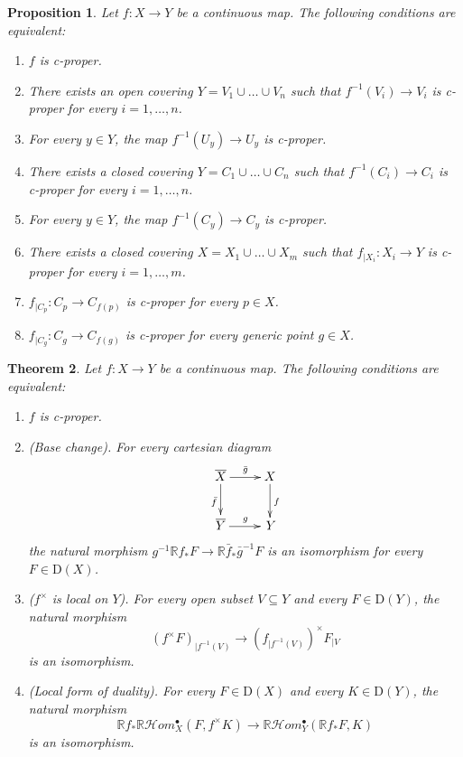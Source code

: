 \documentclass[amssymb,amscd,11pt,20pt]{amsart}
\newcommand{\RR}{\mathbb R}
\newcommand{\0}{\mathbf 0}
\newcommand{\pun}{{\scriptscriptstyle \bullet}}
\newcommand{\HHom}{\mathcal{H}om}
\theoremstyle{plain}
\newtheorem{thm}{Theorem}[section]
\newtheorem{prop}[thm]{Proposition}
\numberwithin{equation}{thm}
\begin{document}
\begin{prop}\label{cohprop-prop} Let $f\colon X\to Y$ be a continuous map. The following conditions are equivalent:
\begin{enumerate} \item $f$ is c-proper.
\item There exists an open covering $Y=V_1\cup\dots\cup V_n$ such that $  f^{-1}(V_i)\to V_i$ is c-proper for every $i=1,\dots,n$.
\item For every $y\in Y$, the map $  f^{-1}(U_y)\to U_y$ is c-proper.
\item There exists a closed covering $Y=C_1\cup\dots\cup C_n$ such that $  f^{-1}(C_i)\to C_i$ is c-proper for every $i=1,\dots,n$.
\item For every $y\in Y$, the map $  f^{-1}(C_y)\to C_y$ is c-proper.
\item There exists a closed covering $X=X_1\cup\dots \cup X_m$ such that $f_{\vert X_i}\colon X_i\to Y$ is c-proper for every $i=1,\dots ,m$.
\item $f_{\vert C_p}\colon C_p\to C_{f(p)}$ is c-proper for every $p\in X$.
\item $f_{\vert C_g}\colon C_g\to C_{f(g)}$ is c-proper for every generic point $g\in X$.
\end{enumerate}
\end{prop}

\begin{thm}\label{cohprop} Let $f\colon X\to Y$ be a continuous map. The following conditions are equivalent:
\begin{enumerate} \item $f$ is c-proper.
\item {\rm (Base change)}. For every cartesian diagram
\[
\xymatrix{ \overline X\ar[d]_{\bar f}\ar[r]^{\bar g} & X \ar[d]^{f} \\   \overline Y\ar[r]^{g}   & \,   Y    
 } 
\] the natural morphism  $g^{-1}\RR f_* F\to  \RR {\bar f}_* {\bar g}^{-1} F$ is an isomorphism  for every $F\in \mathrm{D}(X)$.
\item {\rm ($f^\times$ is local on $Y$)}. For every open subset $V\subseteq Y$ and every $F\in \mathrm{D}(Y)$, the natural morphism $$(f^\times F)_{\vert f^{-1}(V)} \to (f_{\vert f^{-1}(V)})^\times F_{\vert V}  $$ is an isomorphism.
\item{\rm (Local form of duality)}. For every $F\in \mathrm{D}(X)$ and every $K\in \mathrm{D}(Y)$, the natural morphism
\[\RR f_*\RR\HHom_X^\pun(F,f^\times K)\to\RR\HHom_Y^\pun(\RR f_*F,K)\] is an isomorphism.
\end{enumerate}
\end{thm}
\end{document}
